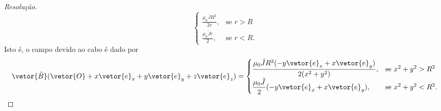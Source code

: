 \begin{proof}[Resolução]
\begin{equation*}
\begin{cases}
            \frac{\mu_0\tilde{J}R^2}{2r},&\text{se }r > R\\
            \frac{\mu_0\tilde{J}r}{2},&\text{se }r < R.
        \end{cases}
    \end{equation*}
    Isto é, o campo devido ao cabo é dado por
    \begin{equation*}
        \vetor{\tilde{B}}(\vetor{O} + x\vetor{e}_x + y \vetor{e}_y + z\vetor{e}_z) = \begin{cases}
            \displaystyle\frac{\mu_0\tilde{J}R^2(- y\vetor{e}_x + x \vetor{e}_y)}{2 (x^2 + y^2)},&\text{se }x^2 + y^2 > R^2\\
            \displaystyle\frac{\mu_0\tilde{J}}{2}( - y\vetor{e}_x + x \vetor{e}_y),&\text{se }x^2 + y^2 < R^2.
        \end{cases}
    \end{equation*}


\end{proof}
